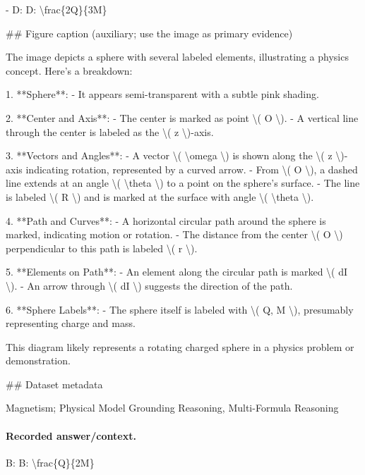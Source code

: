 - D: D: \textbackslash{}frac\{2Q\}\{3M\}

\#\# Figure caption (auxiliary; use the image as primary evidence)

The image depicts a sphere with several labeled elements, illustrating a physics concept. Here's a breakdown:

1. **Sphere**: 
   - It appears semi-transparent with a subtle pink shading.

2. **Center and Axis**:
   - The center is marked as point \textbackslash{}( O \textbackslash{}).
   - A vertical line through the center is labeled as the \textbackslash{}( z \textbackslash{})-axis.

3. **Vectors and Angles**:
   - A vector \textbackslash{}( \textbackslash{}omega \textbackslash{}) is shown along the \textbackslash{}( z \textbackslash{})-axis indicating rotation, represented by a curved arrow.
   - From \textbackslash{}( O \textbackslash{}), a dashed line extends at an angle \textbackslash{}( \textbackslash{}theta \textbackslash{}) to a point on the sphere's surface.
     - The line is labeled \textbackslash{}( R \textbackslash{}) and is marked at the surface with angle \textbackslash{}( \textbackslash{}theta \textbackslash{}).

4. **Path and Curves**:
   - A horizontal circular path around the sphere is marked, indicating motion or rotation.
   - The distance from the center \textbackslash{}( O \textbackslash{}) perpendicular to this path is labeled \textbackslash{}( r \textbackslash{}).

5. **Elements on Path**:
   - An element along the circular path is marked \textbackslash{}( dI \textbackslash{}).
   - An arrow through \textbackslash{}( dI \textbackslash{}) suggests the direction of the path.

6. **Sphere Labels**:
   - The sphere itself is labeled with \textbackslash{}( Q, M \textbackslash{}), presumably representing charge and mass.

This diagram likely represents a rotating charged sphere in a physics problem or demonstration.

\#\# Dataset metadata

Magnetism; Physical Model Grounding Reasoning, Multi-Formula Reasoning

\paragraph{Recorded answer/context.}
B: B: \textbackslash{}frac\{Q\}\{2M\}

